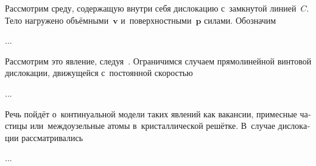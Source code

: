 

\label{para:actionofstressfieldondislocation}

\begin{otherlanguage}{russian}

Рассмотрим среду, содержащую внутри себя дислокацию с~замкнутой линией~$C$.
Тело нагружено объёмными~$\bm{v}$ и~поверхностными~$\bm{p}$ силами.
Обозначим

...


\end{otherlanguage}



\label{para:dislocationmovement}

\begin{otherlanguage}{russian}

Рассмотрим это явление, следуя~\cite{cottrell-dislocations}.
Ограничимся случаем прямо\-линейной винтовой дислокации, движущейся с~постоянной скоростью

...


\end{otherlanguage}



\label{para:pointdefects}

\begin{otherlanguage}{russian}

Речь пойдёт о~континуальной модели таких явлений как вакансии, примесные частицы или~междоузельные атомы в~кристаллической решётке.
В~случае дислокации рассматривались

...


\end{otherlanguage}

